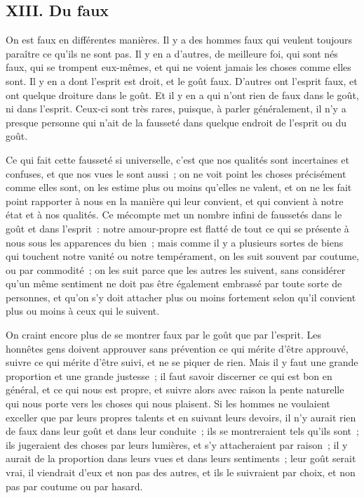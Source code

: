 \documentclass[french,twoside]{book} %
\begin{document}
\subsection[{XIII. Du faux}]{XIII. Du faux}
\noindent On est faux en différentes manières. Il y a des hommes faux qui veulent toujours paraître ce qu’ils ne sont pas. Il y en a d’autres, de meilleure foi, qui sont nés faux, qui se trompent eux-mêmes, et qui ne voient jamais les choses comme elles sont. Il y en a dont l’esprit est droit, et le goût faux. D’autres ont l’esprit faux, et ont quelque droiture dans le goût. Et il y en a qui n’ont rien de faux dans le goût, ni dans l’esprit. Ceux-ci sont très rares, puisque, à parler généralement, il n’y a presque personne qui n’ait de la fausseté dans quelque endroit de l’esprit ou du goût.\par
Ce qui fait cette fausseté si universelle, c’est que nos qualités sont incertaines et confuses, et que nos vues le sont aussi ; on ne voit point les choses précisément comme elles sont, on les estime plus ou moins qu’elles ne valent, et on ne les fait point rapporter à nous en la manière qui leur convient, et qui convient à notre état et à nos qualités. Ce mécompte met un nombre infini de faussetés dans le goût et dans l’esprit : notre amour-propre est flatté de tout ce qui se présente à nous sous les apparences du bien ; mais comme il y a plusieurs sortes de biens qui touchent notre vanité ou notre tempérament, on les suit souvent par coutume, ou par commodité ; on les suit parce que les autres les suivent, sans considérer qu’un même sentiment ne doit pas être également embrassé par toute sorte de personnes, et qu’on s’y doit attacher plus ou moins fortement selon qu’il convient plus ou moins à ceux qui le suivent.\par
On craint encore plus de se montrer faux par le goût que par l’esprit. Les honnêtes gens doivent approuver sans prévention ce qui mérite d’être approuvé, suivre ce qui mérite d’être suivi, et ne se piquer de rien. Mais il y faut une grande proportion et une grande justesse ; il faut savoir discerner ce qui est bon en général, et ce qui nous est propre, et suivre alors avec raison la pente naturelle qui nous porte vers les choses qui nous plaisent. Si les hommes ne voulaient exceller que par leurs propres talents et en suivant leurs devoirs, il n’y aurait rien de faux dans leur goût et dans leur conduite ; ils se montreraient tels qu’ils sont ; ils jugeraient des choses par leurs lumières, et s’y attacheraient par raison ; il y aurait de la proportion dans leurs vues et dans leurs sentiments ; leur goût serait vrai, il viendrait d’eux et non pas des autres, et ils le suivraient par choix, et non pas par coutume ou par hasard.\par
\end{document}
